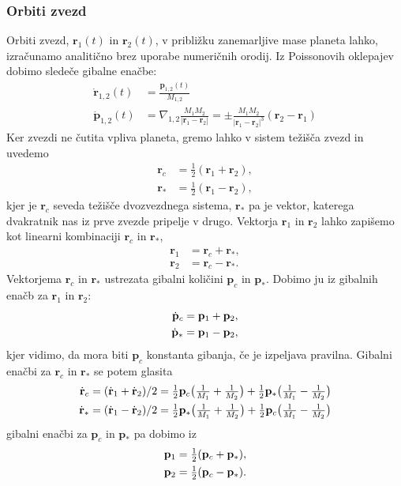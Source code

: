 \documentclass[12pt, a4paper]{article}
\renewcommand{\r}{
    \ensuremath{\mathbf{r}}
}
\newcommand{\p}{
    \ensuremath{\mathbf{p}}
}
\newcommand{\sfrac}[2]{
    \ensuremath{\textstyle{\frac{#1}{#2}}}
}
\begin{document}
\subsubsection{Orbiti zvezd}
Orbiti zvezd, $\r_1(t)$ in $\r_2(t)$, v pribli\v zku zanemarljive mase planeta lahko, izra\v cunamo analiti\v cno brez
uporabe numeri\v cnih orodij. Iz Poissonovih oklepajev dobimo slede\v ce gibalne ena\v cbe:
\begin{align}
    \dot{\r}_{1,2}(t) &= \frac{\p_{1,2}(t)}{M_{1,2}} \\
    \dot{\p}_{1,2}(t) &= \nabla_{1,2} \frac{M_1 M_2}{|\r_1 - \r_2|} = \pm \frac{M_1 M_2}{|\r_1 - \r_2|^3}(\r_2 - \r_1)
    \label{predgibalni}
\end{align}
Ker zvezdi ne \v cutita vpliva planeta, gremo lahko v sistem te\v zi\v s\v ca zvezd in uvedemo
\begin{align*}
    \r_c &= \sfrac{1}{2}(\r_1 + \r_2), \\
    \r_* &= \sfrac{1}{2}(\r_1 - \r_2),
\end{align*}
kjer je $\r_c$ seveda te\v zi\v s\v ce dvozvezdnega sistema, $\r_*$ pa je vektor, katerega dvakratnik nas iz prve
zvezde pripelje v drugo. Vektorja $\r_1$ in $\r_2$ lahko zapi\v semo kot linearni kombinaciji $\r_c$ in $\r_*$,
\begin{align*}
    \r_1 &= \r_c + \r_*, \\
    \r_2 &= \r_c - \r_*.
\end{align*}
Vektorjema $\r_c$ in $\r_*$ ustrezata gibalni koli\v cini $\p_c$ in $\p_*$. Dobimo ju iz gibalnih ena\v cb za $\r_1$
in $\r_2$:
\begin{align}
    \dot{\p}_c &= \p_1 + \p_2, \notag \\
    \dot{\p}_* &= \p_1 - \p_2,
\end{align}
kjer vidimo, da mora biti $\p_c$ konstanta gibanja, \v ce je izpeljava pravilna. Gibalni ena\v cbi za $\r_c$ in $\r_*$ se
potem glasita
\begin{align}
    \dot{\r}_c &= (\dot{\r}_1 + \dot{\r}_2)/2 = \sfrac{1}{2}\p_c\big(\sfrac{1}{M_1} + \sfrac{1}{M_2}\big) +
        \sfrac{1}{2}\p_*\big(\sfrac{1}{M_1} - \sfrac{1}{M_2}\big) \notag \\
    \dot{\r}_* &= (\dot{\r}_1 - \dot{\r}_2)/2 = \sfrac{1}{2}\p_*\big(\sfrac{1}{M_1} + \sfrac{1}{M_2}\big) +
        \sfrac{1}{2}\p_c\big(\sfrac{1}{M_1} - \sfrac{1}{M_2}\big) \notag \\
\end{align}
gibalni ena\v cbi za $\p_c$ in $\p_*$ pa dobimo iz
\begin{align}
    \p_1 &= \sfrac{1}{2}(\p_c + \p_*), \notag \\
    \p_2 &= \sfrac{1}{2}(\p_c - \p_*).
\end{align}
\end{document}
